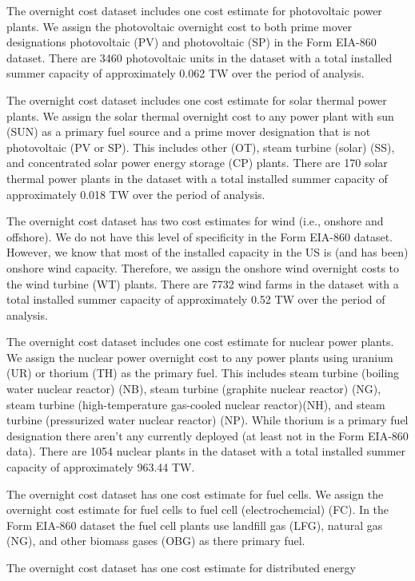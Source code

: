 \documentclass[10pt]{amsart}
\begin{document}
The overnight cost dataset includes one cost estimate for photovoltaic power plants.
We assign the photovoltaic overnight cost to both prime mover designations photovoltaic (PV) and photovoltaic (SP) in the Form EIA-860 dataset.
There are 3460 photovoltaic units in the dataset with a total installed summer capacity of approximately 0.062 TW over the period of analysis. 

The overnight cost dataset includes one cost estimate for solar thermal power plants. 
We assign the solar thermal overnight cost to any power plant with sun (SUN) as a primary fuel source and a prime mover designation that is not photovoltaic (PV or SP).
This includes other (OT), steam turbine (solar) (SS), and concentrated solar power energy storage (CP) plants.  
There are 170 solar thermal power plants in the dataset with a total installed summer capacity of approximately 0.018 TW over the period of analysis.

The overnight cost dataset has two cost estimates for wind (i.e., onshore and offshore).
We do not have this level of specificity in the Form EIA-860 dataset. 
However, we know that most of the installed capacity in the US is (and has been) onshore wind capacity. 
Therefore, we assign the onshore wind overnight costs to the wind turbine (WT) plants. 
There are 7732 wind farms in the dataset with a total installed summer capacity of approximately 0.52 TW over the period of analysis. 

The overnight cost dataset includes one cost estimate for nuclear power plants.
We assign the nuclear power overnight cost to any power plants using uranium (UR) or thorium (TH) as the primary fuel.  
This includes steam turbine (boiling water nuclear reactor) (NB), steam turbine (graphite nuclear reactor) (NG), steam turbine (high-temperature gas-cooled nuclear reactor)(NH), and steam turbine (pressurized water nuclear reactor) (NP).
While thorium is a primary fuel designation there aren't any currently deployed (at least not in the Form EIA-860 data).   
There are 1054 nuclear plants in the dataset with a total installed summer capacity of approximately 963.44 TW.

The overnight cost dataset has one cost estimate for fuel cells.
We assign the overnight cost estimate for fuel cells to fuel cell (electrochemcial) (FC). 
In the Form EIA-860 dataset the fuel cell plants use landfill gas (LFG), natural gas (NG), and other biomass gases (OBG) as there primary fuel. 

The overnight cost dataset has one cost estimate for distributed energy 
\end{document}

